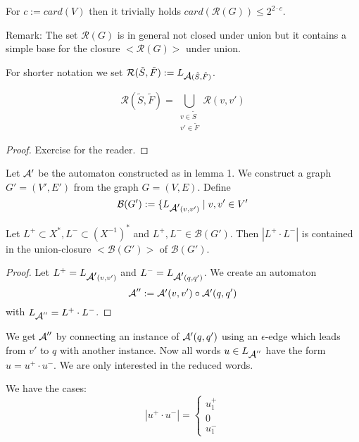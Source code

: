 For $c := card(V)$ then it trivially holds $card(\mathcal{R}(G)) \leq 2^{2
\cdot c}$.

Remark: The set $\mathcal{R}(G)$ is in general not closed under union but it
contains a simple base for the closure $<\mathcal{R}(G)>$ under union.

For shorter notation we set $\mathcal{R}(\tilde{S},\tilde{F}) :=
L_{\mbox{$\mathcal{A}$}(\tilde{S},\tilde{F})}$.

\begin{lemma}
\[ \mathcal{R}(\tilde{S},\tilde{F}) = \bigcup_{\substack{v \in \tilde{S}\\v'
\in \tilde{F}}} \mathcal{R}(v, v') \]
\end{lemma}

\begin{proof}
Exercise for the reader.
\end{proof}

Let $\mbox{$\mathcal{A'}$}$ be the automaton constructed as in lemma 1. We construct a graph
$G' = (V', E')$ from the graph $G = (V, E)$. Define
\[ \mathcal{B}(G') := \{ L_{\mbox{$\mathcal{A'}$}(v, v')} \mid v, v' \in V' \]

\begin{lemma}
Let $L^+ \subset X^*, L^- \subset (X^{-1})^*$ and $L^+, L^- \in
\mathcal{B}(G')$. Then $|L^+ \cdot L^-|$ is contained in the union-closure
$<\mathcal{B}(G')>$ of $\mathcal{B}(G')$.
\end{lemma}

\begin{proof}
Let $L^+ = L_{\mbox{$\mathcal{A'}$}(v, v')}$ and $L^- = L_{\mbox{$\mathcal{A'}$}(q, q')}$. We create an
automaton
\[ \mbox{$\mathcal{A}$}'' := \mbox{$\mathcal{A'}$}(v, v') \circ \mbox{$\mathcal{A'}$}(q, q') \]
with $L_{\mbox{$\mathcal{A}$}''} = L^+ \cdot L^-$.
\end{proof}

We get $\mbox{$\mathcal{A}$}''$ by connecting an instance of $\mbox{$\mathcal{A'}$}(q, q')$ using an
$\epsilon$-edge which leads from $v'$ to $q$ with another instance. Now all
words $u \in L_{\mbox{$\mathcal{A}$}''}$ have the form $u = u^+ \cdot u^-$. We are only
interested in the reduced words.

We have the cases:
\[ |u^+ \cdot u^-| = \begin{cases}
u_1^+ \\ 0 \\ u_1^-
\end{cases} \]






































